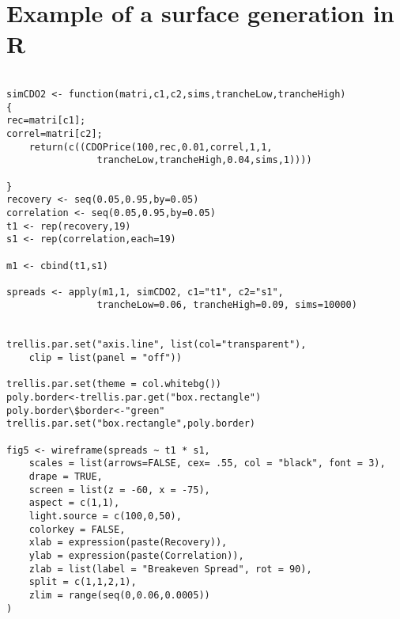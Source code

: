\section{Example of a surface generation in R}\label{sec:surface}
\begin{singlespace}
\begin{lstlisting}

simCDO2 <- function(matri,c1,c2,sims,trancheLow,trancheHigh)
{
rec=matri[c1];
correl=matri[c2];
	return(c((CDOPrice(100,rec,0.01,correl,1,1,
				trancheLow,trancheHigh,0.04,sims,1))))

}
recovery <- seq(0.05,0.95,by=0.05)
correlation <- seq(0.05,0.95,by=0.05)
t1 <- rep(recovery,19)
s1 <- rep(correlation,each=19)

m1 <- cbind(t1,s1)

spreads <- apply(m1,1, simCDO2, c1="t1", c2="s1", 
				trancheLow=0.06, trancheHigh=0.09, sims=10000)


trellis.par.set("axis.line", list(col="transparent"),
	clip = list(panel = "off"))

trellis.par.set(theme = col.whitebg())
poly.border<-trellis.par.get("box.rectangle")
poly.border\$border<-"green"
trellis.par.set("box.rectangle",poly.border)

fig5 <- wireframe(spreads ~ t1 * s1, 
	scales = list(arrows=FALSE, cex= .55, col = "black", font = 3), 
	drape = TRUE,
	screen = list(z = -60, x = -75),
	aspect = c(1,1),
	light.source = c(100,0,50),
	colorkey = FALSE,
	xlab = expression(paste(Recovery)),
	ylab = expression(paste(Correlation)),
	zlab = list(label = "Breakeven Spread", rot = 90),
	split = c(1,1,2,1),
	zlim = range(seq(0,0.06,0.0005))
)

\end{lstlisting}
\end{singlespace}




